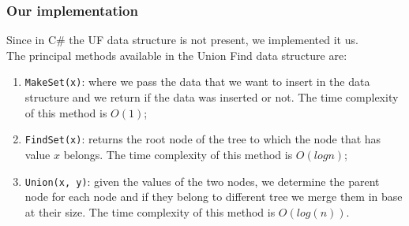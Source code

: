 \subsubsection{Our implementation}
Since in C\# the UF data structure is not present, we implemented it us.\\
The principal methods available in the Union Find data structure are:
\begin{enumerate}
    \item \verb|MakeSet(x)|: where we pass the data that we want to insert in the data structure and we return 
        if the data was inserted or not. The time complexity of this method is $O(1)$;
    \item \verb|FindSet(x)|: returns the root node of the tree to which the node that has value $x$ belongs.
        The time complexity of this method is $O(log n)$;
    \item \verb|Union(x, y)|: given the values of the two nodes, we determine the parent node for each node and 
        if they belong to different tree we merge them in base at their size. The time complexity of this 
        method is $O(log(n))$.
\end{enumerate}

